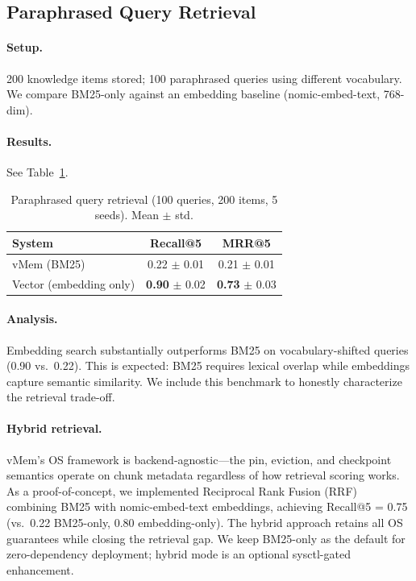 \documentclass[10pt,twocolumn]{article}
\begin{document}
\subsection{Paraphrased Query Retrieval}
\label{sec:paraphrase}

\paragraph{Setup.} 200 knowledge items stored; 100 paraphrased queries using different vocabulary. We compare BM25-only against an embedding baseline (nomic-embed-text, 768-dim).

\paragraph{Results.} See Table~\ref{tab:retention}.

\begin{table}[t]
\centering
\caption{Paraphrased query retrieval (100 queries, 200 items, 5 seeds). Mean $\pm$ std.}
\label{tab:retention}
\small
\begin{tabular}{lcc}
\toprule
System & Recall@5 & MRR@5 \\
\midrule
vMem (BM25)           & 0.22 $\pm$ 0.01 & 0.21 $\pm$ 0.01 \\
Vector (embedding only)    & \textbf{0.90} $\pm$ 0.02 & \textbf{0.73} $\pm$ 0.03 \\
\bottomrule
\end{tabular}
\end{table}

\paragraph{Analysis.} Embedding search substantially outperforms BM25 on vocabulary-shifted queries (0.90 vs.\ 0.22). This is expected: BM25 requires lexical overlap while embeddings capture semantic similarity. We include this benchmark to honestly characterize the retrieval trade-off.

\paragraph{Hybrid retrieval.} vMem's OS framework is backend-agnostic---the pin, eviction, and checkpoint semantics operate on chunk metadata regardless of how retrieval scoring works. As a proof-of-concept, we implemented Reciprocal Rank Fusion (RRF)~\cite{rrf2009cormack} combining BM25 with nomic-embed-text embeddings, achieving Recall@5 = 0.75 (vs.\ 0.22 BM25-only, 0.80 embedding-only). The hybrid approach retains all OS guarantees while closing the retrieval gap. We keep BM25-only as the default for zero-dependency deployment; hybrid mode is an optional sysctl-gated enhancement.
\end{document}
